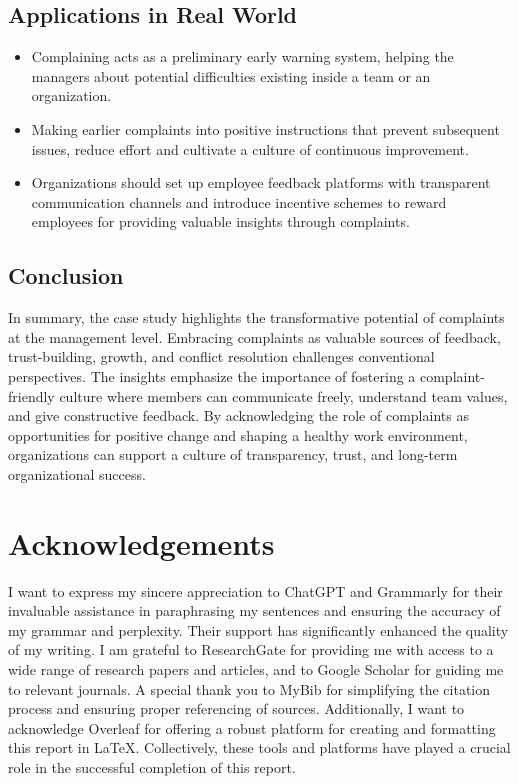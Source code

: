 \documentclass[a4paper,12pt]{article}
\begin{document}
\subsection{Applications in Real World}
\begin{itemize}
    \item Complaining acts as a preliminary early warning system, helping the managers about potential difficulties existing inside a team or an organization.
    \item Making earlier complaints into positive instructions that prevent subsequent issues, reduce effort and cultivate a culture of continuous improvement.
    \item Organizations should set up employee feedback platforms with transparent communication channels and introduce incentive schemes to reward employees for providing valuable insights through complaints.
\end{itemize}
\subsection{Conclusion}
In summary, the case study highlights the transformative potential of complaints at the management level. Embracing complaints as valuable sources of feedback, trust-building, growth, and conflict resolution challenges conventional perspectives. The insights emphasize the importance of fostering a complaint-friendly culture where members can communicate freely, understand team values, and give constructive feedback. By acknowledging the role of complaints as opportunities for positive change and shaping a healthy work environment, organizations can support a culture of transparency, trust, and long-term organizational success.

\newpage
\section{Acknowledgements}
I want to express my sincere appreciation to ChatGPT and Grammarly for their invaluable assistance in paraphrasing my sentences and ensuring the accuracy of my grammar and perplexity. Their support has significantly enhanced the quality of my writing. I am grateful to ResearchGate for providing me with access to a wide range of research papers and articles, and to Google Scholar for guiding me to relevant journals. A special thank you to MyBib for simplifying the citation process and ensuring proper referencing of sources. Additionally, I want to acknowledge Overleaf for offering a robust platform for creating and formatting this report in LaTeX. Collectively, these tools and platforms have played a crucial role in the successful completion of this report.
\end{document}
